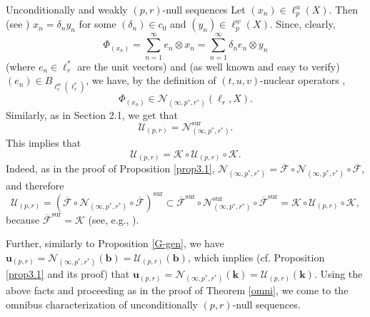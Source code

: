 \documentclass[a4paper,11pt]{amsart}
\theoremstyle{definition}
\theoremstyle{definition}
\theoremstyle{definition}
\begin{document}
\begin{section}{Unconditionally and weakly ${{(p,r)}}$-null sequences}
Let $(x_n)\in \ell_p^u(X)$. Then (see \cite[Lemma~1.2]{FS1}) $x_n=\delta_n y_n$ for some $(\delta _n)\in c_0$ and $(y_n)\in \ell_p^w(X)$. Since, clearly, 
\[
\Phi _{(x_n)}= \sum_{n=1}^\infty e_n \otimes x_n = \sum _{n=1}^\infty \delta _n e_n \otimes y_n
\]
(where $e_n\in \ell_r ^\ast $ are the unit vectors) and (as well known and easy to verify) $(e_n)\in B_{\ell_r^w (\ell_r ^\ast)}$, we have, by the definition of $(t,u,v)$-nuclear operators \cite[18.1.1]{P},
\[
\Phi _{(x_n)}\in {{\mathcal N}}_{(\infty , {p^{\ast}}, {r^{\ast}})}(\ell_r, X).
\]
Similarly, as in Section 2.1, we get that
\[
{{\mathcal U}}_{{(p,r)}} = {{\mathcal N}}^{\mathrm{sur}}_{(\infty, {p^{\ast}}, {r^{\ast}})}.
\]
This implies that 
\[
{{\mathcal U}}_{{(p,r)}} = {{\mathcal K}}\circ {{\mathcal U}}_{{(p,r)}} \circ {{\mathcal K}} .
\]
Indeed, as in the proof of Proposition \ref{prop3.1}, ${{\mathcal N}}_{(\infty, {p^{\ast}}, {r^{\ast}})}= \overline {{\mathcal F}} \circ {{\mathcal N}}_{(\infty, {p^{\ast}}, {r^{\ast}})} \circ \overline {{\mathcal F}}$, and therefore 
\[
{{\mathcal U}}_{{(p,r)}} =(\overline {{\mathcal F}} \circ {{\mathcal N}}_{(\infty, {p^{\ast}}, {r^{\ast}})}\circ \overline {{\mathcal F}})^\mathrm{sur}\subset \overline {{\mathcal F}} ^\mathrm{sur} \circ {{\mathcal N}}_{(\infty, {p^{\ast}}, {r^{\ast}})}^\mathrm{sur} \circ \overline {{\mathcal F}} ^\mathrm{sur} = {{\mathcal K}} \circ {{\mathcal U}}_{{(p,r)}} \circ {{\mathcal K}},
\]
because $\overline {{\mathcal F}} ^\mathrm{sur}={{\mathcal K}}$ (see, e.g., \cite[4.7.13]{P}).

Further, similarly to Proposition \ref{G-gen}, we have ${\boldsymbol{u}}_{{(p,r)}} ={{\mathcal N}}_{(\infty, {p^{\ast}}, {r^{\ast}})}({\boldsymbol{b}}) = {{\mathcal U}}_{{(p,r)}} ({\boldsymbol{b}})$, which implies (cf. Proposition \ref{prop3.1} and its proof) that ${\boldsymbol{u}}_{{(p,r)}} = {{\mathcal N}}_{(\infty, {p^{\ast}}, {r^{\ast}})} ({\boldsymbol{k}})={{\mathcal U}}_{{(p,r)}} ({\boldsymbol{k}})$. Using the above facts and proceeding as in the proof of Theorem \ref{omni}, we come to the omnibus characterization of unconditionally ${{(p,r)}}$-null sequences.


\end{section}
\end{document}
